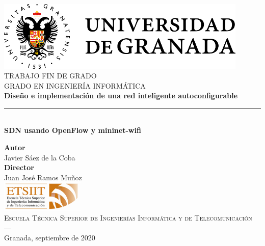 \begin{titlepage}
 
 
\newlength{\centeroffset}
\setlength{\centeroffset}{-0.5\oddsidemargin}
\addtolength{\centeroffset}{0.5\evensidemargin}
\thispagestyle{empty}

\noindent\hspace*{\centeroffset}\begin{minipage}{\textwidth}

\centering
\includegraphics[width=0.9\textwidth]{imagenes/logo_ugr_nuevo.png}
\\[1.4cm]

\textsc{ \Large TRABAJO FIN DE GRADO\\[0.2cm]}
\textsc{ GRADO EN INGENIERÍA INFORMÁTICA}\\[1cm]
% 
{\Huge\bfseries Diseño e implementación de una red inteligente autoconfigurable\\
}
\noindent\rule[-1ex]{\textwidth}{3pt}\\[3.5ex]
{\large\bfseries SDN usando OpenFlow y mininet-wifi}
\end{minipage}

\vspace{0.5cm}
\noindent\hspace*{\centeroffset}\begin{minipage}{\textwidth}
\centering

\textbf{Autor}\\ {Javier Sáez de la Coba}\\[2.5ex]
\textbf{Director}\\
{Juan José Ramos Muñoz}\\[2cm]
\includegraphics[width=0.3\textwidth]{imagenes/etsiit_logo.png}\\[0.1cm]
\textsc{Escuela Técnica Superior de Ingenierías Informática y de Telecomunicación}\\
\textsc{---}\\
Granada, septiembre de 2020
\end{minipage}
\end{titlepage}


